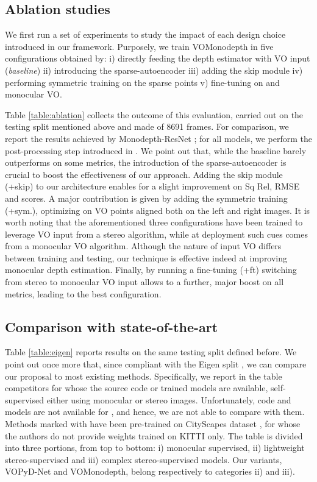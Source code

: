 \documentclass[10pt,twocolumn,letterpaper]{article}
\begin{document}
\subsection{Ablation studies}

We first run a set of experiments to study the impact of each design choice introduced in our framework. Purposely, we train VOMonodepth in five configurations obtained by: i) directly feeding the depth estimator with VO input (\textit{baseline}) ii) introducing the sparse-autoencoder iii) adding the skip module iv) performing symmetric training on the sparse points v) fine-tuning on  and monocular VO.

Table \ref{table:ablation} collects the outcome of this evaluation, carried out on the testing split mentioned above and made of 8691 frames. For comparison, we report the results achieved by Monodepth-ResNet \cite{Godard1}; for all models, we perform the post-processing step introduced in \cite{Godard1}.
We point out that, while the baseline barely outperforms \cite{Godard1} on some metrics, the introduction of the sparse-autoencoder is crucial to boost the effectiveness of our approach. Adding the skip module (+skip) to our architecture enables for a slight improvement on Sq Rel, RMSE and  scores.
A major contribution is given by adding the symmetric training (+sym.), optimizing on VO points aligned both on the left and right images.
It is worth noting that the aforementioned three configurations have been trained to leverage VO input from a stereo algorithm, while at deployment such cues comes from a monocular VO algorithm. Although the nature of input VO differs between training and testing, our technique is effective indeed at improving monocular depth estimation.
Finally, by running a fine-tuning (+ft) switching from stereo to monocular VO input allows to a further, major boost on all metrics, leading to the best configuration.

\subsection{Comparison with state-of-the-art}

Table \ref{table:eigen} reports results on the same testing split defined before. We point out once more that, since compliant with the Eigen split \cite{Eigen}, we can compare our proposal to most existing methods. Specifically, we report in the table competitors for whose the source code or trained models are available, self-supervised either using monocular or stereo images. Unfortunately, code and models are not available for \cite{yang2018deep,Pilzer_2019_CVPR}, and hence, we are not able to compare with them.
Methods marked with  have been pre-trained on CityScapes dataset \cite{cityscapes}, for whose the authors do not provide weights trained on KITTI only.
The table is divided into three portions, from top to bottom: i) monocular supervised, ii) lightweight stereo-supervised and iii) complex stereo-supervised models. Our variants, VOPyD-Net and VOMonodepth, belong respectively to categories ii) and iii).
\end{document}
